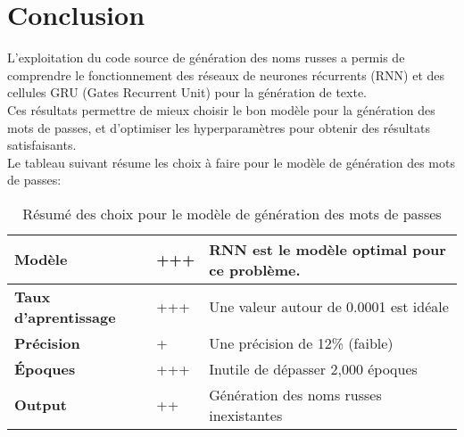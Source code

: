 \section{Conclusion}
L'exploitation du code source de génération des noms russes a permis de comprendre le fonctionnement des réseaux de neurones récurrents (RNN) et des cellules GRU (Gates Recurrent Unit) pour la génération de texte.\\
Ces résultats permettre de mieux choisir le bon modèle pour la génération des mots de passes, et d'optimiser les hyperparamètres pour obtenir des résultats satisfaisants.\\
Le tableau suivant résume les choix à faire pour le modèle de génération des mots de passes:

\begin{table}[H]
    \centering
    \begin{tabularx}{\textwidth}{|X|X|X|}
        \hline
        \textbf{Modèle}              & +++ & RNN est le modèle optimal pour ce problème. \\
        \hline
        \textbf{Taux d'aprentissage} & +++ & Une valeur autour de 0.0001 est idéale      \\
        \hline
        \textbf{Précision}           & +   & Une précision de 12\% (faible)              \\
        \hline
        \textbf{Époques}             & +++ & Inutile de dépasser 2,000 époques           \\
        \hline
        \textbf{Output}              & ++  & Génération des noms russes inexistantes     \\
        \hline
    \end{tabularx}
    \caption{Résumé des choix pour le modèle de génération des mots de passes}
    \label{tab:conclusion}
\end{table}